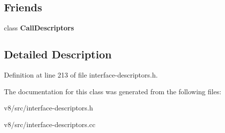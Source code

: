 \subsection*{Friends}
\begin{DoxyCompactItemize}
\item 
\mbox{\label{classv8_1_1internal_1_1CallInterfaceDescriptor_a414ced238eeffeee9fc27d3c17f61f88}} 
class {\bfseries Call\+Descriptors}
\end{DoxyCompactItemize}


\subsection{Detailed Description}


Definition at line 213 of file interface-\/descriptors.\+h.



The documentation for this class was generated from the following files\+:\begin{DoxyCompactItemize}
\item 
v8/src/interface-\/descriptors.\+h\item 
v8/src/interface-\/descriptors.\+cc\end{DoxyCompactItemize}
